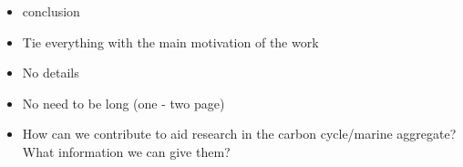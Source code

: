 \begin{itemize}
  \item conclusion
  \item Tie everything with the main motivation of the work
  \item No details
  \item No need to be long (one - two page)
  \item How can we contribute to aid research in the carbon cycle/marine aggregate? What information we can give them?
\end{itemize}